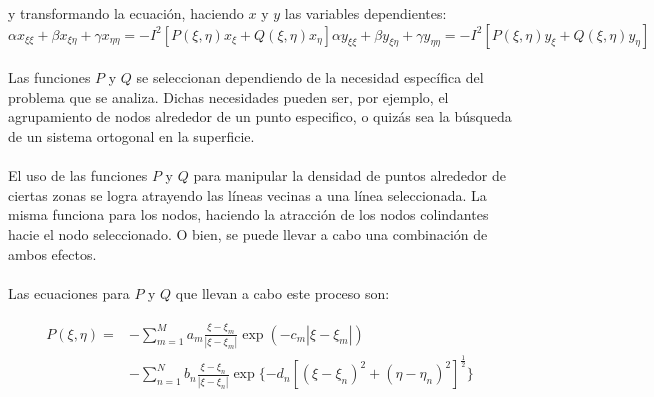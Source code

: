 \documentclass[letterpaper, openright, 12pt]{book}
\begin{document}
					y transformando la ecuación, haciendo $x$ y $y$  las variables dependientes:
					\begin{subequations}
						\begin{equation}
							\alpha x_{\xi \xi} + \beta x_{\xi \eta} + \gamma x_{\eta \eta} = -I^2 [P(\xi, \eta) x_{\xi} + Q(\xi, \eta) x_{\eta}]
						\end{equation}
						\begin{equation}
						\alpha y_{\xi \xi} + \beta y_{\xi \eta} + \gamma y_{\eta \eta} = -I^2 [P(\xi, \eta) y_{\xi} + Q(\xi, \eta) y_{\eta}]
						\end{equation}
						\label{ec-poisson-invertida}
					\end{subequations}
			
			\paragraph*{}
				Las funciones $P$ y $Q$ se seleccionan dependiendo de la necesidad específica del problema que se analiza. Dichas necesidades pueden ser, por ejemplo, el agrupamiento de nodos alrededor de un punto especifico, o quizás sea la búsqueda de un sistema ortogonal en la superficie.
			
			\paragraph*{}
				El uso de las funciones $P$ y $Q$ para manipular la densidad de puntos alrededor de ciertas zonas se logra atrayendo las líneas vecinas a una línea seleccionada. La misma funciona para los nodos, haciendo la atracción de los nodos colindantes hacie el nodo seleccionado. O bien, se puede llevar a cabo una combinación de ambos efectos.
			
			\paragraph*{}
				Las ecuaciones para $P$ y $Q$ que llevan a cabo este proceso son:
				
				\begin{align}
					\begin{aligned}
						P(\xi, \eta) =& - \sum_{m = 1}^{M} a_{m} \frac{\xi - \xi_{m}}{|\xi - \xi_{m}|} \exp(-c_{m}|\xi - \xi_{m}|) \\&
						- \sum_{n=1}^{N} b_{n} \frac{\xi - \xi_{n}}{| \xi - \xi_{n} |} \exp\lbrace -d_{n} \left[ \left( \xi - \xi_{n} \right)^2 + \left( \eta - \eta_{n} \right)^2 \right]^\frac{1}{2} \rbrace
					\end{aligned}
					\label{ec-P}
				\end{align}
				
\end{document}
